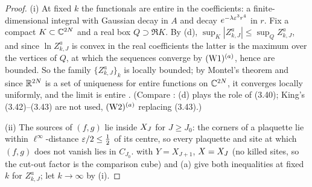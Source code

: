 \begin{proof}
(i) At fixed $k$ the functionals are entire in the coefficients: a finite-dimensional integral with Gaussian decay in $A$ and decay $e^{-\lambda\varepsilon^3r^4}$ in $r$. Fix a compact $K\subset\mathbb C^{2N}$ and a real box $Q\supset\Re K$. By (d), $\sup_K|Z^a_{k,J}|\le\sup_QZ^a_{k,J}$, and since $\ln Z^a_{k,J}$ is convex in the real coefficients the latter is the maximum over the vertices of $Q$, at which the sequences converge by $(\mathrm{W1})^{(a)}$, hence are bounded. So the family $\{Z^a_{k,J}\}_k$ is locally bounded; by Montel's theorem and since $\mathbb R^{2N}$ is a set of uniqueness for entire functions on $\mathbb C^{2N}$, it converges locally uniformly, and the limit is entire \cite{Hor90}. (Compare \cite[(3.40)--(3.44)]{K2}: (d) plays the role of (3.40); King's (3.42)--(3.43) are not used, $(\mathrm{W2})^{(a)}$ replacing (3.43).)

(ii) The sources of $(f,g)$ lie inside $X_J$ for $J\ge J_0$: the corners of a plaquette lie within $\ell^\infty$-distance $\varepsilon/2\le\frac12$ of its centre, so every plaquette and site at which $(f,g)$ does not vanish lies in $C_{J_0}$.  with $Y=X_{J+1}$, $X=X_J$ (no killed sites, so the cut-out factor is the comparison cube) and (a) give both inequalities at fixed $k$ for $Z^a_{k,J}$; let $k\to\infty$ by (i).


\end{proof}
